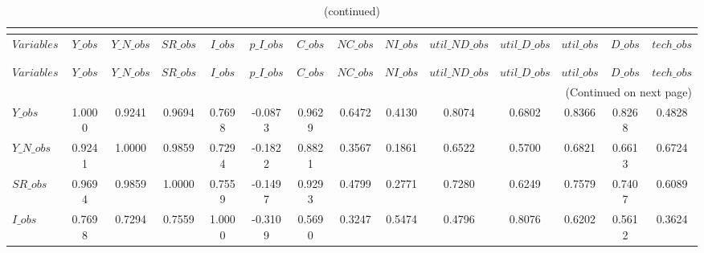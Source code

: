  
\begin{center}
\begin{longtable}{lccccccccccccc} 
\caption{MATRIX OF CORRELATIONS}\\
 \label{Table:th_corr_matrix}\\
\toprule 
$Variables      $	 & 	 $          Y\_obs$	 & 	 $      Y\_N\_obs$	 & 	 $         SR\_obs$	 & 	 $          I\_obs$	 & 	 $      p\_I\_obs$	 & 	 $          C\_obs$	 & 	 $         NC\_obs$	 & 	 $         NI\_obs$	 & 	 $  util\_ND\_obs$	 & 	 $   util\_D\_obs$	 & 	 $       util\_obs$	 & 	 $          D\_obs$	 & 	 $       tech\_obs$\\
\midrule \endfirsthead 
\caption{(continued)}\\
 \toprule \\ 
$Variables      $	 & 	 $          Y\_obs$	 & 	 $      Y\_N\_obs$	 & 	 $         SR\_obs$	 & 	 $          I\_obs$	 & 	 $      p\_I\_obs$	 & 	 $          C\_obs$	 & 	 $         NC\_obs$	 & 	 $         NI\_obs$	 & 	 $  util\_ND\_obs$	 & 	 $   util\_D\_obs$	 & 	 $       util\_obs$	 & 	 $          D\_obs$	 & 	 $       tech\_obs$\\
\midrule \endhead 
\midrule \multicolumn{14}{r}{(Continued on next page)} \\ \bottomrule \endfoot 
\bottomrule \endlastfoot 
$Y\_obs         $	 & 	           1.0000	 & 	           0.9241	 & 	           0.9694	 & 	           0.7698	 & 	          -0.0873	 & 	           0.9629	 & 	           0.6472	 & 	           0.4130	 & 	           0.8074	 & 	           0.6802	 & 	           0.8366	 & 	           0.8268	 & 	           0.4828 \\ 
$Y\_N\_obs      $	 & 	           0.9241	 & 	           1.0000	 & 	           0.9859	 & 	           0.7294	 & 	          -0.1822	 & 	           0.8821	 & 	           0.3567	 & 	           0.1861	 & 	           0.6522	 & 	           0.5700	 & 	           0.6821	 & 	           0.6613	 & 	           0.6724 \\ 
$SR\_obs        $	 & 	           0.9694	 & 	           0.9859	 & 	           1.0000	 & 	           0.7559	 & 	          -0.1497	 & 	           0.9293	 & 	           0.4799	 & 	           0.2771	 & 	           0.7280	 & 	           0.6249	 & 	           0.7579	 & 	           0.7407	 & 	           0.6089 \\ 
$I\_obs         $	 & 	           0.7698	 & 	           0.7294	 & 	           0.7559	 & 	           1.0000	 & 	          -0.3109	 & 	           0.5690	 & 	           0.3247	 & 	           0.5474	 & 	           0.4796	 & 	           0.8076	 & 	           0.6202	 & 	           0.5612	 & 	           0.3624 \\ 

\end{longtable}
\end{center}
